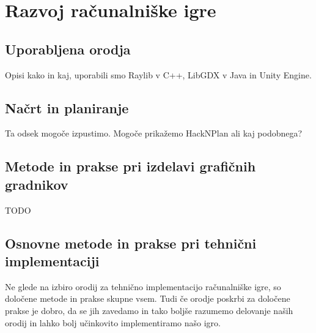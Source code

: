 \documentclass[12pt,a4paper,twoside]{book}
\begin{document}
\chapter{Razvoj računalniške igre}\thispagestyle{fancy}
\label{chapter:razvojIger}
\section{Uporabljena orodja}
Opisi kako in kaj, uporabili smo Raylib v C++, LibGDX v Java in Unity Engine.

\section{Načrt in planiranje}
Ta odsek mogoče izpustimo. Mogoče prikažemo HackNPlan ali kaj podobnega?
\section{Metode in prakse pri izdelavi grafičnih gradnikov}
TODO

\section{Osnovne metode in prakse pri tehnični implementaciji}
Ne glede na izbiro orodij za tehnično implementacijo računalniške igre, so določene metode in prakse skupne vsem. Tudi če orodje poskrbi za določene prakse je dobro, da se jih zavedamo in tako boljše razumemo delovanje naših orodij in lahko bolj učinkovito implementiramo našo igro.
\end{document}
